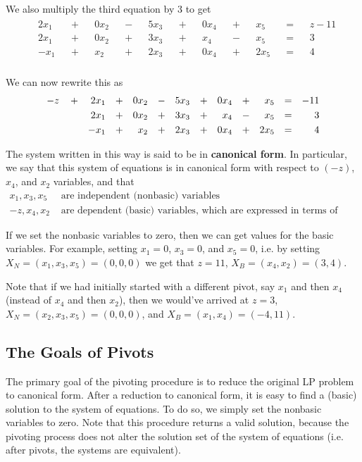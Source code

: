 We also multiply the third equation by $3$ to get
\begin{eqnarray}
    \label{example01}
    \begin{aligned}
        && 2x_1 &&+&& 0x_2 &&-&& 5x_3 &&+&& 0x_4 &&+&& x_5 &&=&& z -11& \\
        && 2x_1 &&+&& 0x_2 &&+&& 3x_3 &&+&& x_4 &&-&& x_5 &&=&& 3& \\
        && -x_1 &&+&& x_2 &&+&& 2x_3 &&+&& 0x_4 &&+&& 2x_5 &&=&& 4& \\
    \end{aligned}
\end{eqnarray}

We can now rewrite this as
\begin{eqnarray}
    \label{example01}
    \begin{aligned}
        -z \hspace{4mm}+ && 2x_1 &&+&& 0x_2 &&-&& 5x_3 &&+&& 0x_4 &&+&& x_5 &&=&& -11& \\
        && 2x_1 &&+&& 0x_2 &&+&& 3x_3 &&+&& x_4 &&-&& x_5 &&=&& 3& \\
        && -x_1 &&+&& x_2 &&+&& 2x_3 &&+&& 0x_4 &&+&& 2x_5 &&=&& 4& \\
    \end{aligned}
\end{eqnarray}

The system written in this way is said to be in \textbf{canonical form}. In
particular, we say that this system of equations is in canonical form with
respect to $(-z)$, $x_4$, and $x_2$ variables, and that 
\begin{align*}
    x_1, x_3, x_5 &\text{ are independent (nonbasic) variables} \\
    -z, x_4, x_2 &\text{ are dependent (basic) variables, which are expressed
        in terms of other variables.}
\end{align*}

If we set the nonbasic variables to zero, then we can get values for the basic
variables. For example, setting $x_1=0$, $x_3=0$, and $x_5=0$, i.e. by setting
$X_N = (x_1,x_3,x_5) = (0,0,0)$ we get that $z=11$, $X_B = (x_4,x_2) = (3,4)$.

Note that if we had initially started with a different pivot, say $x_1$ and
then $x_4$ (instead of $x_4$ and then $x_2$), then we would've arrived at
$z=3$, $X_N = (x_2,x_3,x_5) = (0,0,0)$, and $X_B = (x_1,x_4) = (-4,11)$.


\subsection{The Goals of Pivots}
The primary goal of the pivoting procedure is to reduce the original LP problem
to canonical form. After a reduction to canonical form, it is easy to find a
(basic) solution to the system of equations. To do so, we simply set the
nonbasic variables to zero. Note that this procedure returns a valid solution,
because the pivoting process does not alter the solution set of the system of
equations (i.e. after pivots, the systems are equivalent).

